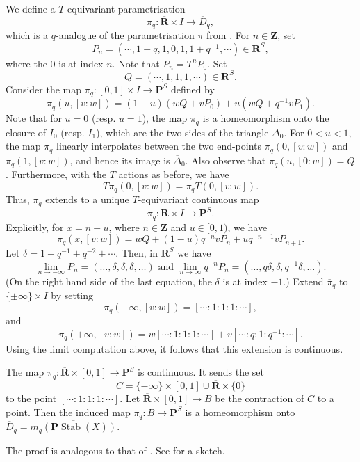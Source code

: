 \documentclass{amsart}
\begin{document}
We define a \(T\)-equivariant parametrisation
\[ \pi_q \colon \overline{\mathbf{R}} \times I \to \overline D_q,\]
which is a \(q\)-analogue of the parametrisation \(\pi\) from .
For \(n \in \mathbf{Z}\), set
\[ P_n = (\cdots , 1+q , 1,  0 , 1 , 1+q^{-1} , \cdots) \in \mathbf{R}^S,\]
where the \(0\) is at index \(n\).
Note that \(P_n = T^nP_0\).
Set
\[ Q = (\cdots , 1, 1, 1, \cdots ) \in \mathbf{R}^S.\]
Consider the map \(\pi_{q} \colon [0,1] \times I \to \mathbf{P}^S\) defined by
\[ \pi_q(u,[v:w]) = (1-u)(wQ + vP_0) + u (wQ + q^{-1}vP_1).\]
Note that for \(u = 0\) (resp. \(u = 1\)), the map \(\pi_q\) is a homeomorphism onto the closure of \(I_0\) (resp. \(I_1\)), which are the two sides of the triangle \(\Delta_0\).
For \(0 < u < 1\), the map \(\pi_q\) linearly interpolates between the two end-points \(\pi_q(0,[v:w])\) and \(\pi_q(1,[v:w])\), and hence its image is \(\overline \Delta_0\).
Also observe that \(\pi_q(u,[0:w]) = Q\).
Furthermore, with the \(T\) actions as before, we have
\[ T \pi_q(0,[v:w]) = \pi_q T(0,[v:w]).\]
Thus, \(\pi_q\) extends to a unique \(T\)-equivariant continuous map
\[ \pi_q \colon \mathbf{R} \times I \to \mathbf{P}^S.\]
Explicitly, for \(x = n + u\), where \(n \in \mathbf{Z}\) and \(u \in [0,1)\), we have
\[ \pi_q(x,[v:w]) = w Q + (1-u) q^{-n}v P_n + u q^{-n-1}vP_{n+1}.\]
Let \(\delta = 1 + q^{-1} + q^{-2} + \cdots\).
Then, in \(\mathbf{R}^S\) we have
\[ \lim_{n \to -\infty} P_n = (\dots, \delta, \delta, \delta, \dots) \text{ and } \lim_{n \to \infty}q^{-n}P_n = (\dots, q \delta,\delta ,q^{-1} \delta,\dots).\]
(On the right hand side of the last equation, the \(\delta\) is at index \(-1\).)
Extend \(\overline \pi_q\) to \(\{\pm \infty\} \times I\) by setting
\[ \pi_q(-\infty, [v:w]) = [\cdots : 1 : 1 : 1 : \cdots],\]
and
\[ \pi_q(+\infty, [v:w]) = w [\cdots : 1 : 1 : 1 : \cdots] + v [\cdots : q : 1 : q^{-1} : \cdots].\]
Using the limit computation above, it follows that this extension is continuous.
\begin{theorem}\label{prop:q-pi}
  The map \(\pi_{q} \colon \overline{\mathbf{R}} \times [0,1] \to \mathbf{P}^S\) is continuous.
  It sends the set \[C = \{- \infty\} \times [0,1] \cup \overline{\mathbf{R}} \times \{0\}\]
  to the point \([\cdots: 1: 1: 1: \cdots]\).
  Let \(\overline{\mathbf{R}} \times [0,1] \to B\) be the contraction of \(C\) to a point.
  Then the induced map \(\pi_{q} \colon B \to \mathbf{P}^S\) is a homeomorphism onto \(\overline D_q = \overline{m_{q}(\mathbf{P}\operatorname{Stab}(X))}\).
\end{theorem}
The proof is analogous to that of .
See  for a sketch.
\end{document}
